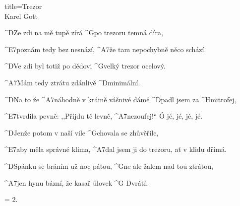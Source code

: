 \begin{song}{title=\predtitle\centering Trezor \\\large Karel Gott  \vspace*{-0.3cm}}  %
\begin{centerjustified}
\nejnejvetsi

\sloka 
	^{D}Ze zdi na mě tupě zírá ^{G}po trezoru temná díra,

	^{E7\z}poznám tedy bez nesnází, ^{A7}že tam nepochybně něco schází.

	^{D}Ve zdi byl totiž po dědovi ^{G\z}velký trezor ocelový.

	^{A7\z}Mám tedy ztrátu zdánlivě ^{\z D}minimální.
      
\sloka
	^{D}Na to že ^{A7\z}náhodně v krámě vášnivé dámě ^{D\z}padl jsem za ^{Hmi}trofej,

	^{E7\z}tvrdila pevně: ,,Přijdu tě levně, ^{A7\z}nezoufej!`` Ó jé, jé, jé, jé.

	^{D\z}Jenže potom v naší vile ^{G\z}chovala se zhůvěřile,

	^{E7}aby měla správné klima, ^{A7}dal jsem ji do trezoru, ať v klidu dřímá.
      
	^{D\z}Spánku se bráním už noc pátou, ^{G}ne ale žalem nad tou ztrátou,

	^{A7}jen hynu bázní, že kasař úlovek ^{G D}vrátí.
      
\sloka = 2.
      

\end{centerjustified}
\setcounter{Slokočet}{0}
\end{song}
